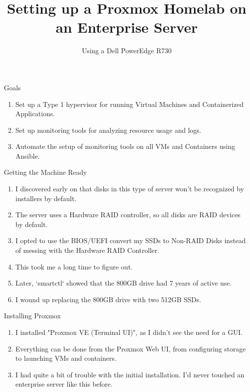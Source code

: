 \documentclass[14pt,compress,usenames,dvipsnames,aspectratio=169]{beamer}
\title{\textbf{Setting up a Proxmox Homelab on an Enterprise Server}}
\author{Using a Dell PowerEdge R730}
\date{}  %
\begin{document}

\begin{frame}[plain]
\titlepage
\end{frame}


\begin{frame}{Goals}
    \begin{enumerate}
        \item{Set up a Type 1 hypervisor for running Virtual Machines and
            Containerized Applications.} 
        \item{Set up monitoring tools for analyzing resource usage and logs. }
        \item{Automate the setup of monitoring tools on all VMs and Containers using
            Ansible.}
    \end{enumerate}
\end{frame}


\begin{frame}{Getting the Machine Ready}
    \begin{enumerate}
        \item{I discovered early on that disks in this type of server won't be recognized by installers by default.} 
        \item{The server uses a Hardware RAID controller, so all disks are RAID devices by default.}
        \item{I opted to use the BIOS/UEFI convert my SSDs to Non-RAID Disks instead of messing with the Hardware RAID Controller.}
        \item{This took me a long time to figure out.}
        \item{Later, `smartctl` showed that the 800GB drive had 7 years of active use.} 
        \item{I wound up replacing the 800GB drive with two 512GB SSDs.} 
    \end{enumerate}
\end{frame}

\begin{frame}{Installing Proxmox}
    \begin{enumerate}
        \item{I installed "Proxmox VE (Terminal UI)", as I didn't see the need for a
        GUI.} 
        \item{Everything can be done from the Proxmox Web UI, from configuring
        storage to launching VMs and containers.}
        \item{I had quite a bit of trouble with the initial installation. I'd never
            touched an enterprise server like this before.}
    \end{enumerate}
\end{frame}
\end{document}
